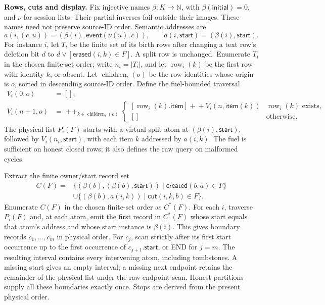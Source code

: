 \textbf{Rows, cuts and display.}
Fix injective names $\beta:K\to\mathbb N$, with
$\beta(\mathsf{initial})=0$, and $\nu$ for session lists. Their partial
inverses fail outside their images. These names need not preserve source-ID
order. Semantic addresses are
\[
 a(i,(c,u))=(\beta(i),\mathsf{event}(\nu(u),c)),\qquad
 a(i,\mathsf{start})=(\beta(i),\mathsf{start}).
\]
For instance $i$, let $T_i$ be the finite set of its birth rows after
changing a text row's deletion bit $d$ to
$d\lor[\mathsf{erased}(i,k)\in F]$.
A split row is unchanged. Enumerate $T_i$ in the chosen finite-set order;
write $n_i=|T_i|$, and let $\operatorname{row}_i(k)$ be the first row
with identity $k$, or absent. Let $\operatorname{children}_i(o)$ be the
row identities whose origin is $o$, sorted in descending source-ID order.
Define the fuel-bounded traversal
\[
\begin{aligned}
V_i(0,o)&=[],\\
V_i(n+1,o)&=\mathop{+\!+}_{k\in\operatorname{children}_i(o)}
\begin{cases}
[\operatorname{row}_i(k).\mathsf{item}]
 +\!+V_i(n,\mathsf{item}(k))&\operatorname{row}_i(k)\text{ exists},\\
[]&\text{otherwise}.
\end{cases}
\end{aligned}
\]
The physical list $P_i(F)$ starts with a virtual split atom at
$(\beta(i),\mathsf{start})$, followed by $V_i(n_i,\mathsf{start})$,
with each item $k$ addressed by $a(i,k)$. The fuel is sufficient on
honest closed rows; it also defines the raw query on malformed cycles.

Extract the finite owner/start record set
\[
\begin{aligned}
C(F)={}&\{(\beta(b),(\beta(b),\mathsf{start}))
       \mid\mathsf{created}(b,a)\in F\}\\
&\cup\{(\beta(b),a(i,k))\mid\mathsf{cut}(i,k,b)\in F\}.
\end{aligned}
\]
Enumerate $C(F)$ in the chosen finite-set order as $C^*(F)$.
For each $i$, traverse $P_i(F)$ and, at each atom, emit the first record
in $C^*(F)$ whose start equals that atom's address and whose start
instance is $\beta(i)$. This gives boundary records $c_1,\ldots,c_m$ in
physical order. For $c_j$, scan strictly after its first start occurrence
up to the first occurrence of $c_{j+1}.\mathsf{start}$, or END for $j=m$.
The resulting interval contains every intervening atom, including
tombstones. A missing start gives an empty interval; a missing next endpoint
retains the remainder of the physical list under the raw endpoint scan. Honest partitions supply all these boundaries exactly
once. Stops are derived from the present physical order.

